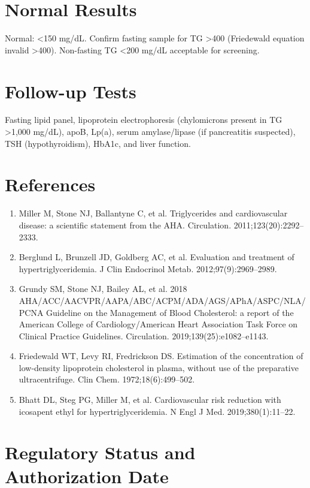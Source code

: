 \section*{Normal Results}
Normal: <150 mg/dL. Confirm fasting sample for TG >400 (Friedewald equation invalid >400). Non-fasting TG <200 mg/dL acceptable for screening.
\section*{Follow-up Tests}
Fasting lipid panel, lipoprotein electrophoresis (chylomicrons present in TG >1,000 mg/dL), apoB, Lp(a), serum amylase/lipase (if pancreatitis suspected), TSH (hypothyroidism), HbA1c, and liver function.
\section*{References}
\begin{enumerate}
  \item Miller M, Stone NJ, Ballantyne C, et al. Triglycerides and cardiovascular disease: a scientific statement from the AHA. Circulation. 2011;123(20):2292--2333.
  \item Berglund L, Brunzell JD, Goldberg AC, et al. Evaluation and treatment of hypertriglyceridemia. J Clin Endocrinol Metab. 2012;97(9):2969--2989.
  \item Grundy SM, Stone NJ, Bailey AL, et al. 2018 AHA/\allowbreak{}ACC/\allowbreak{}AACVPR/\allowbreak{}AAPA/\allowbreak{}ABC/\allowbreak{}ACPM/\allowbreak{}ADA/\allowbreak{}AGS/\allowbreak{}APhA/\allowbreak{}ASPC/\allowbreak{}NLA/\allowbreak{}PCNA Guideline on the Management of Blood Cholesterol: a report of the American College of Cardiology/American Heart Association Task Force on Clinical Practice Guidelines. Circulation. 2019;139(25):e1082--e1143.
  \item Friedewald WT, Levy RI, Fredrickson DS. Estimation of the concentration of low-density lipoprotein cholesterol in plasma, without use of the preparative ultracentrifuge. Clin Chem. 1972;18(6):499--502.
  \item Bhatt DL, Steg PG, Miller M, et al. Cardiovascular risk reduction with icosapent ethyl for hypertriglyceridemia. N Engl J Med. 2019;380(1):11--22.
\end{enumerate}
\clearpage
\section*{Regulatory Status and Authorization Date}

\clearpage
